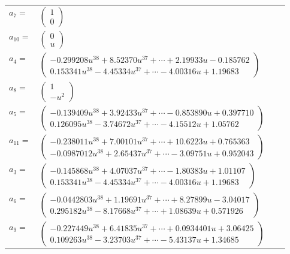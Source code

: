 \documentclass[1p]{elsarticle_modified}
\theoremstyle{definition}
\begin{document}
\begin{tabular}{m{7pt} m{180pt} m{7pt} m{180pt} }
\flushright $a_{7}=$&$\begin{pmatrix}1\\0\end{pmatrix}$ \\
\flushright $a_{10}=$&$\begin{pmatrix}0\\u\end{pmatrix}$ \\
\flushright $a_{4}=$&$\begin{pmatrix}-0.299208 u^{38}+8.52370 u^{37}+\cdots+2.19933 u-0.185762\\0.153341 u^{38}-4.45334 u^{37}+\cdots-4.00316 u+1.19683\end{pmatrix}$ \\
\flushright $a_{8}=$&$\begin{pmatrix}1\\- u^2\end{pmatrix}$ \\
\flushright $a_{5}=$&$\begin{pmatrix}-0.139409 u^{38}+3.92433 u^{37}+\cdots-0.853890 u+0.397710\\0.126095 u^{38}-3.74672 u^{37}+\cdots-4.15512 u+1.05762\end{pmatrix}$ \\
\flushright $a_{11}=$&$\begin{pmatrix}-0.238011 u^{38}+7.00101 u^{37}+\cdots+10.6223 u+0.765363\\-0.0987012 u^{38}+2.65437 u^{37}+\cdots-3.09751 u+0.952043\end{pmatrix}$ \\
\flushright $a_{3}=$&$\begin{pmatrix}-0.145868 u^{38}+4.07037 u^{37}+\cdots-1.80383 u+1.01107\\0.153341 u^{38}-4.45334 u^{37}+\cdots-4.00316 u+1.19683\end{pmatrix}$ \\
\flushright $a_{6}=$&$\begin{pmatrix}-0.0442803 u^{38}+1.19691 u^{37}+\cdots+8.27899 u-3.04017\\0.295182 u^{38}-8.17668 u^{37}+\cdots+1.08639 u+0.571926\end{pmatrix}$ \\
\flushright $a_{9}=$&$\begin{pmatrix}-0.227449 u^{38}+6.41835 u^{37}+\cdots+0.0934401 u+3.06425\\0.109263 u^{38}-3.23703 u^{37}+\cdots-5.43137 u+1.34685\end{pmatrix}$ \\

\end{tabular}
\end{document}
